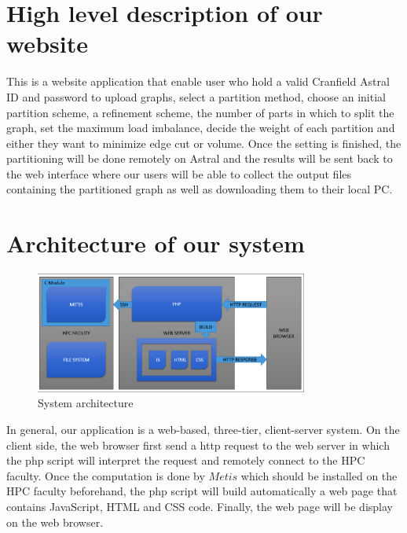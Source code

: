 \documentclass{cranfieldChart}
\begin{document}
\section{High level description of our website}
This is a website application that enable user who hold a valid Cranfield Astral ID and password to upload graphs, select a partition method, choose an initial partition scheme, a refinement scheme, the number of parts in which to split the graph, set the maximum load imbalance, decide the weight of each partition and either they want to minimize edge cut or volume. 
Once the setting is finished, the partitioning will be done remotely on Astral and the results will be sent back to the web interface where our users will be able to collect the output files containing the partitioned graph as well as downloading them to their local PC. 

\section{Architecture of our system}
\begin{figure}[h]
\centering
\includegraphics[width=0.8\textwidth]{ressources/architect}
\caption{System architecture}
\end{figure}
In general, our application is a web-based, three-tier, client-server system. On the client side, the web browser first send a http request to the web server in which the php script will interpret the request and remotely connect to the HPC faculty. Once the computation is done by $Metis$ which should be installed on the HPC faculty beforehand, the php script will build automatically a web page that contains JavaScript, HTML and CSS code. Finally, the web page will be display on the web browser. 
\end{document}
